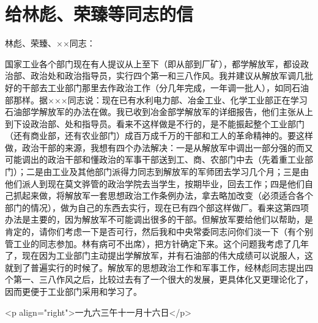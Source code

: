 \section[给林彪、荣臻等同志的信（一九六三年十一月十六日）]{给林彪、荣臻等同志的信}


林彪、荣臻、××同志：

国家工业各个部门现在有人提议从上至下（即从部到厂矿），都学解放军，都设政治部、政治处和政治指导员，实行四个第一和三八作风。我并建议从解放军调几批好的干部去工业部门那里去作政治工作（分几年完成，一年调一批人），如同石油部那样。据×××同志说：现在已有水利电力部、冶金工业、化学工业部正在学习石油部学解放军的办法在做。我已收到冶金部学解放军的详细报告，他们主张从上到下设政治部、处和指导员。看来不这样做是不行的，是不能振起整个工业部门（还有商业部，还有农业部门）成百万成千万的干部和工人的革命精神的。要这样做，政治干部的来源，我想有四个办法解决：一是从解放军中调出一部分强的而又可能调出的政治干部和懂政治的军事干部送到工、商、农部门中去（先着重工业部门）；二是由工业及其他部门派得力同志到解放军的军师团去学习几个月；三是由他们派人到现在莫文骅管的政治学院去当学生，按期毕业，回去工作；四是他们自己抓起来做，将解放军一套思想政治工作条例办法，拿去略加改变（必须适合各个部门的情况），做为自己的东西去实行，现在已有四个部这样做厂。看来这第四项办法是主要的，因为解放军不可能调出很多的干部。但解放军要给他们以帮助，是肯定的，请你们考虑一下是否可行，然后我和中央常委同志问你们淡一下（有个别管工业的同志参加。林有病可不出席），把方针确定下来。这个问题我考虑了几年了，现在因为工业部门主动提出学解放军，并有石油部的伟大成绩可以说服人，这就到了普遍实行的时候了。解放军的思想政治工作和军事工作，经林彪同志提出四个第一、三八作风之后，比较过去有了一个很大的发展，更具体化又更理论化了，因而更便于工业部门采用和学习了。

<p align="right">一九六三午十一月十六日</p>


